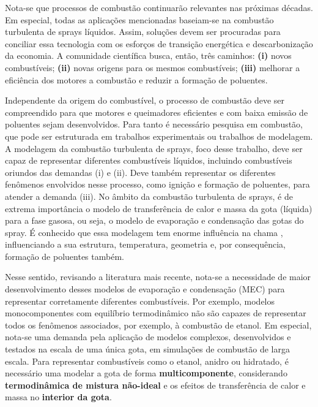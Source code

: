 Nota-se que processos de combustão continuarão relevantes nas próximas décadas.
Em especial, todas as aplicações mencionadas baseiam-se na combustão turbulenta de sprays líquidos.
Assim, soluções devem ser procuradas para conciliar essa tecnologia com os esforços de transição energética e descarbonização da economia.
A comunidade científica busca, então, três caminhos: \textbf{(i)} novos combustíveis; \textbf{(ii)} novas origens para os mesmos combustíveis; \textbf{(iii)} melhorar a eficiência dos motores a combustão e reduzir a formação de poluentes.


Independente da origem do combustível, o processo de combustão deve ser compreendido para que motores e queimadores eficientes e com baixa emissão de poluentes sejam desenvolvidos.
Para tanto é necessário pesquisa em combustão, que pode ser estruturada em trabalhos experimentais ou trabalhos de modelagem.
A modelagem da combustão turbulenta de sprays, foco desse trabalho, deve ser capaz de representar diferentes combustíveis líquidos, incluindo combustíveis oriundos das demandas (i) e (ii).
Deve também representar os diferentes fenômenos envolvidos nesse processo, como ignição e formação de poluentes, para atender a demanda (iii).
No âmbito da combustão turbulenta de sprays, é de extrema importância o modelo de transferência de calor e massa da gota (líquida) para a fase gasosa, ou seja, o modelo de evaporação e condensação das gotas do spray.
É conhecido que essa modelagem tem enorme influência na chama \cite{JennyB2012}, influenciando a sua estrutura, temperatura, geometria e, por consequência, formação de poluentes também.

Nesse sentido, revisando a literatura mais recente, nota-se a necessidade de maior desenvolvimento desses modelos de evaporação e condensação (MEC) para representar corretamente diferentes combustíveis.
Por exemplo, modelos monocomponentes com equilíbrio termodinâmico não são capazes de representar todos os fenômenos associados, por exemplo, à combustão de etanol.
Em especial, nota-se uma demanda pela aplicação de modelos complexos, desenvolvidos e testados na escala de uma única gota, em simulações de combustão de larga escala.
Para representar combustíveis como o etanol, anidro ou hidratado, é necessário uma modelar a gota de forma \textbf{multicomponente}, considerando \textbf{termodinâmica de mistura não-ideal} e os efeitos de transferência de calor e massa no \textbf{interior da gota}.

